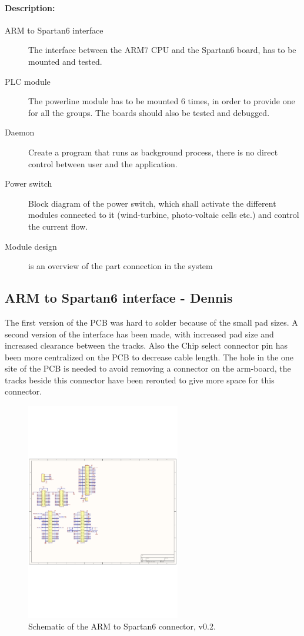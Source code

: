 \paragraph{Description:}
\begin{description}
	\item[ARM to Spartan6 interface] The interface between the ARM7 CPU and the Spartan6 board, has to be mounted and tested.
	\item[PLC module] The powerline module has to be mounted 6 times, in order to provide one for all the groups. The boards should also be tested and debugged.
	\item[Daemon]  Create a program that runs as background process, there is no direct control between user and the application.
	\item[Power switch] Block diagram of the power switch, which shall activate the different modules connected to it (wind-turbine, photo-voltaic cells etc.) and control the current flow.
	\item[Module design] is an overview of the part connection in the system
\end{description}

\subsection{ARM to Spartan6 interface - Dennis}
The first version of the PCB was hard to solder because of the small pad sizes. A second version of the interface has been made, with increased pad size and increased clearance between the tracks. Also the Chip select connector pin has been more centralized on the PCB to decrease cable length. The hole in the one site of the PCB is needed to avoid removing a connector on the arm-board, the tracks beside this connector have been rerouted to give more space for this connector. 
\begin{figure}[H]
	\begin{centering}
		 \includegraphics[width=0.60\textwidth,page=1]{content/appendix/eudp/images/dig_to_ea_v0_2}
		\caption{Schematic of the ARM to Spartan6 connector, v0.2.}
	\end{centering}
\end{figure}

